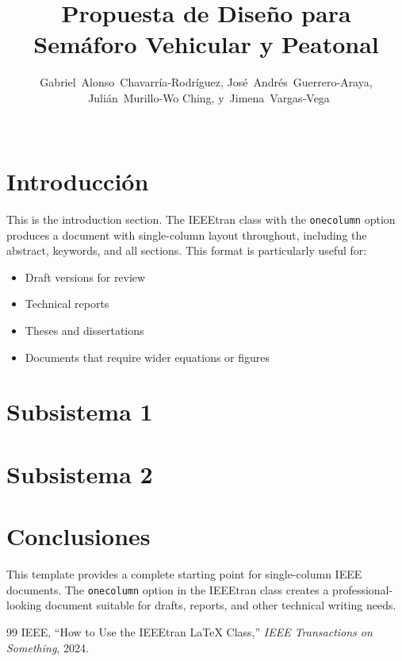 \documentclass[journal, one column,10pt]{IEEEtran}
\title{Propuesta de Diseño para Semáforo Vehicular y Peatonal}
\author{

		Gabriel~Alonso~Chavarría-Rodríguez,
		José~Andrés~Guerrero-Araya,
    ~Julián~Murillo-Wo Ching,
    y~Jimena~Vargas-Vega \\
    ~\IEEEmembership{Estudiantes,~ITCR}
}
\begin{document}
\maketitle

\begin{abstract}

\end{abstract}

\begin{IEEEkeywords}

\end{IEEEkeywords}

\section{Introducción}

This is the introduction section. The IEEEtran class with the \texttt{onecolumn} option produces a document with single-column layout throughout, including the abstract, keywords, and all sections. This format is particularly useful for:

\begin{itemize}
    \item Draft versions for review
    \item Technical reports
    \item Theses and dissertations
    \item Documents that require wider equations or figures
\end{itemize}

\section{Subsistema 1}

\section{Subsistema 2}


\section{Conclusiones}

This template provides a complete starting point for single-column IEEE documents. The \texttt{onecolumn} option in the IEEEtran class creates a professional-looking document suitable for drafts, reports, and other technical writing needs.


\begin{thebibliography}{99}
IEEE, ``How to Use the IEEEtran LaTeX Class,'' \textit{IEEE Transactions on Something}, 2024.
\end{thebibliography}
\end{document}
